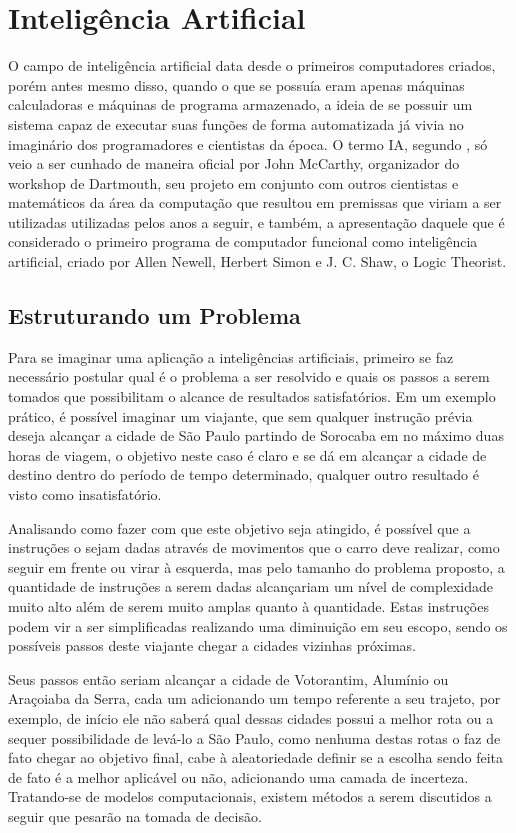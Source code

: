 \chapter{Intelig{\^e}ncia Artificial}

O campo de inteligência artificial data desde o primeiros computadores
criados, porém antes mesmo disso, quando o que se possuía eram apenas
máquinas calculadoras e máquinas de programa armazenado, a ideia de se
possuir um sistema capaz de executar suas funções de forma
automatizada já vivia no imaginário dos programadores e cientistas da
época. O termo IA, segundo , só veio a ser
cunhado de maneira oficial por John McCarthy, organizador do workshop
de Dartmouth, seu projeto em conjunto com outros cientistas e
matemáticos da área da computação que resultou em premissas que viriam
a ser utilizadas utilizadas pelos anos a seguir, e também, a
apresentação daquele que é considerado o primeiro programa de
computador funcional como inteligência artificial, criado por Allen
Newell, Herbert Simon e J. C. Shaw, o Logic Theorist.

\section{Estruturando um Problema}

Para se imaginar uma aplicação a inteligências artificiais, primeiro
se faz necessário postular qual é o problema a ser resolvido e quais
os passos a serem tomados que possibilitam o alcance de resultados
satisfatórios. Em um exemplo prático, é possível imaginar um viajante,
que sem qualquer instrução prévia deseja alcançar a cidade de São
Paulo partindo de Sorocaba em no máximo duas horas de viagem, o
objetivo neste caso é claro e se dá em alcançar a cidade de destino
dentro do período de tempo determinado, qualquer outro resultado é
visto como insatisfatório.

Analisando como fazer com que este objetivo seja atingido, é possível
que a instruções o sejam dadas através de movimentos que o carro deve
realizar, como seguir em frente ou virar à esquerda, mas pelo tamanho
do problema proposto, a quantidade de instruções a serem dadas
alcançariam um nível de complexidade muito alto além de serem muito
amplas quanto à quantidade. Estas instruções podem vir a ser
simplificadas realizando uma diminuição em seu escopo, sendo os
possíveis passos deste viajante chegar a cidades vizinhas próximas.

Seus passos então seriam alcançar a cidade de Votorantim, Alumínio ou
Araçoiaba da Serra, cada um adicionando um tempo referente a seu
trajeto, por exemplo, de início ele não saberá qual dessas cidades
possui a melhor rota ou a sequer possibilidade de levá-lo a São Paulo,
como nenhuma destas rotas o faz de fato chegar ao objetivo final, cabe
à aleatoriedade definir se a escolha sendo feita de fato é a melhor
aplicável ou não, adicionando uma camada de incerteza. Tratando-se de
modelos computacionais, existem métodos a serem discutidos a seguir
que pesarão na tomada de decisão.

